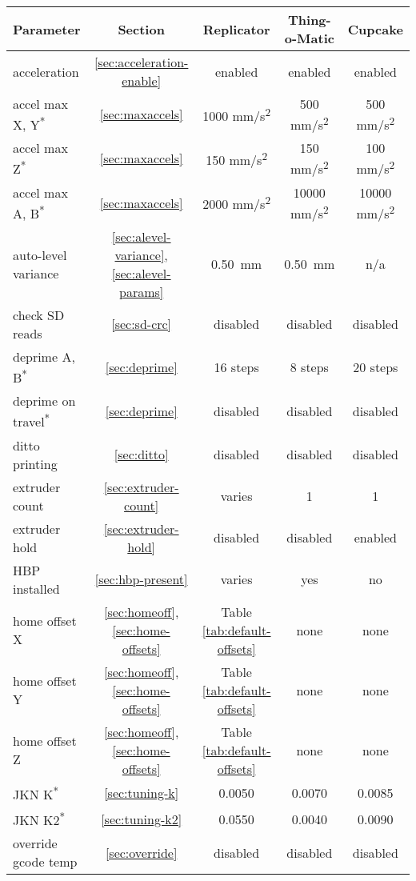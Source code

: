 {\def\NB{\textsuperscript{*}}
{\begin{table}[!hb]
\centering
{}
\begin{tabular}{l | c | c c c }
\hline
\textbf{Parameter} & \textbf{Section} & \textbf{Replicator} & \textbf{Thing-o-Matic} & \textbf{Cupcake} \\
\hline
acceleration & \ref{sec:acceleration-enable} & enabled & enabled & enabled \\
accel max X, Y\NB & \ref{sec:maxaccels} & 1000 mm/s\textsuperscript{2} & 500 mm/s\textsuperscript{2} & 500 mm/s\textsuperscript{2} \\
accel max Z\NB & \ref{sec:maxaccels} & 150 mm/s\textsuperscript{2} & 150 mm/s\textsuperscript{2} & 100 mm/s\textsuperscript{2} \\
accel max A, B\NB & \ref{sec:maxaccels} & 2000 mm/s\textsuperscript{2} & 10000 mm/s\textsuperscript{2} & 10000 mm/s\textsuperscript{2} \\
auto-level variance & \ref{sec:alevel-variance}, \ref{sec:alevel-params} & 0.50~mm & 0.50~mm & n/a \\
check SD reads & \ref{sec:sd-crc} & disabled & disabled & disabled \\
deprime A, B\NB & \ref{sec:deprime} & 16 steps & 8 steps & 20 steps \\
deprime on travel\NB & \ref{sec:deprime} & disabled & disabled & disabled \\
ditto printing & \ref{sec:ditto} & disabled & disabled & disabled \\
extruder count & \ref{sec:extruder-count} & varies & 1 & 1 \\
extruder hold & \ref{sec:extruder-hold} & disabled & disabled & enabled \\
HBP installed & \ref{sec:hbp-present} & varies & yes & no \\
home offset X & \ref{sec:homeoff}, \ref{sec:home-offsets} & Table \ref{tab:default-offsets} & none & none \\
home offset Y & \ref{sec:homeoff}, \ref{sec:home-offsets} & Table \ref{tab:default-offsets} & none & none \\
home offset Z & \ref{sec:homeoff}, \ref{sec:home-offsets} & Table \ref{tab:default-offsets} & none & none \\
JKN K\NB & \ref{sec:tuning-k} & 0.0050 & 0.0070 & 0.0085 \\
JKN K2\NB & \ref{sec:tuning-k2} & 0.0550 & 0.0040 & 0.0090 \\
override gcode temp & \ref{sec:override} & disabled & disabled & disabled \\

\end{tabular}
\end{table}}}

